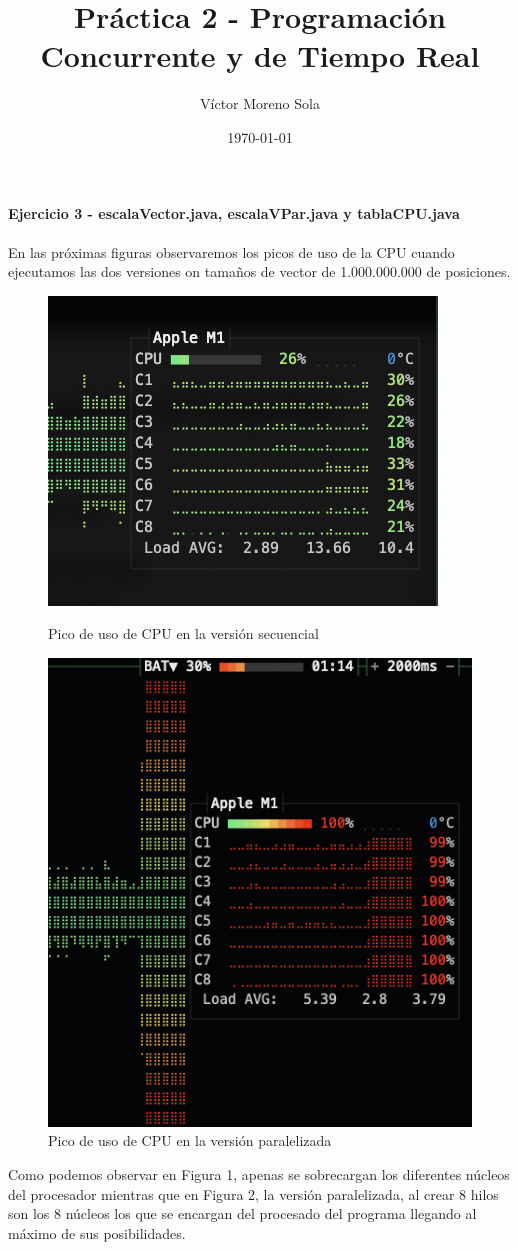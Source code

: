 \documentclass[12pt]{article}
\title{Práctica 2 - Programación Concurrente y de Tiempo Real}
\author{Víctor Moreno Sola}
\date{\today}
\begin{document}
\maketitle

\textbf{Ejercicio 3 - escalaVector.java, escalaVPar.java y tablaCPU.java}
\\
\\En las próximas figuras observaremos los picos de uso de la CPU cuando ejecutamos las dos versiones on tamaños de vector de 1.000.000.000 de posiciones.

    \begin{figure}[h!]
        \centering
        \includegraphics[scale=0.5]{images/psecuencial1000000000.png}
        \caption{Pico de uso de CPU en la versión secuencial}
        \label{fig:my_label}
    
        \vspace{1cm}
        
        \centering
        \includegraphics[scale=0.4]{paralelo1000000000}
        \caption{Pico de uso de CPU en la versión paralelizada}
        \label{fig:my_label}
        
    \end{figure}   
        


Como podemos observar en Figura 1, apenas se sobrecargan los diferentes núcleos del procesador mientras que en Figura 2, la versión paralelizada, al crear 8 hilos son los 8 núcleos los que se encargan del procesado del programa llegando al máximo de sus posibilidades.
\end{document}
